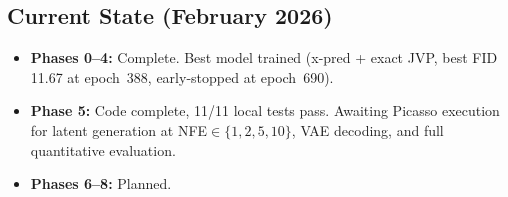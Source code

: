 \subsection{Current State (February 2026)}

\begin{itemize}[nosep]
  \item \textbf{Phases 0--4:} Complete. Best model trained (x-pred + exact JVP,
    best FID 11.67 at epoch~388, early-stopped at epoch~690).
  \item \textbf{Phase 5:} Code complete, 11/11 local tests pass.  Awaiting
    Picasso execution for latent generation at NFE$\in\{1,2,5,10\}$, VAE
    decoding, and full quantitative evaluation.
  \item \textbf{Phases 6--8:} Planned.
\end{itemize}
